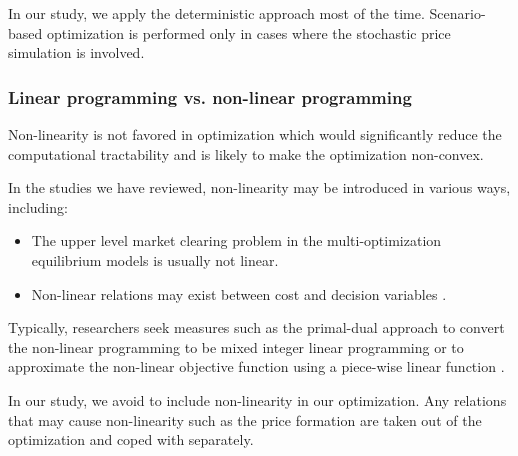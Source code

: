 In our study, we apply the deterministic approach most of the time. Scenario-based optimization is performed only in cases where the stochastic price simulation is involved.

\subsubsection{Linear programming vs. non-linear programming}

Non-linearity is not favored in optimization which would significantly reduce the computational tractability and is likely to make the optimization non-convex.

In the studies we have reviewed, non-linearity may be introduced in various ways, including:
\begin{itemize}
	\item The upper level market clearing problem in the multi-optimization equilibrium models is usually not linear. \cite{He2012,Mohsenian-Rad2016,HenriquezAuba2017,Vespermann2017,Huang2017} 
	\item Non-linear relations may exist between cost and decision variables \cite{Mahmoudi2017}.
\end{itemize}

Typically, researchers seek measures such as the primal-dual approach to convert the non-linear programming to be mixed integer linear programming \cite{Zhang2016,Storage2015,HenriquezAuba2017,Mohsenian-Rad2016} or to approximate the non-linear objective function using a piece-wise linear function \cite{Mahmoudi2017}.

In our study, we avoid to include non-linearity in our optimization. Any relations that may cause non-linearity such as the price formation are taken out of the optimization and coped with separately.






